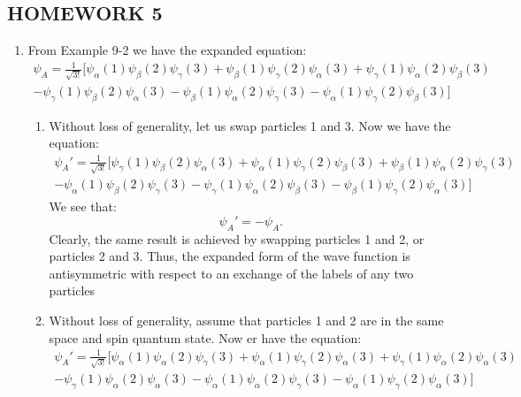 \documentclass[10pt]{article}
\begin{document}

\begin{centering}
  \section*{HOMEWORK 5}
\end{centering}

\begin{enumerate}
\item 
  From Example 9-2 we have the expanded equation:
 \begin{multline*}
   \psi_A = \frac{1}{\sqrt{3!}} [ \psi_ \alpha (1) \psi_ \beta(2) \psi_ \gamma(3) + \psi_ \beta(1) \psi_ \gamma(2) \psi_ \alpha(3) + \psi_ \gamma(1) \psi_ \alpha(2) \psi_ \beta(3) \\ 
   - \psi_ \gamma(1) \psi_ \beta (2) \psi_ \alpha(3) - \psi_ \beta(1) \psi_ \alpha (2) \psi_ \gamma (3) - \psi_ \alpha (1) \psi_ \gamma(2) \psi_ \beta(3) ]
 \end{multline*}
\begin{enumerate}
  \item Without loss of generality, let us swap particles 1 and 3. Now we have the equation:
  \begin{multline*}
    \psi_A' = \frac{1}{\sqrt{3!}} [ \psi_ \gamma (1) \psi_ \beta(2) \psi_ \alpha(3) + \psi_ \alpha(1) \psi_ \gamma(2) \psi_ \beta(3) + \psi_ \beta(1) \psi_ \alpha(2) \psi_ \gamma(3) \\ 
    - \psi_ \alpha(1) \psi_ \beta (2) \psi_ \gamma(3) - \psi_ \gamma(1) \psi_ \alpha (2) \psi_ \beta (3) - \psi_ \beta (1) \psi_ \gamma(2) \psi_ \alpha(3) ]
  \end{multline*}
  We see that: 
  \[
    \psi_A' = - \psi_A
  .\]
  Clearly, the same result is achieved by swapping particles 1 and 2, or particles 2 and 3.
  Thus, the expanded form of the wave function is antisymmetric with respect to an exchange of the labels of any two particles
  \item Without loss of generality, assume that particles 1 and 2 are in the same space and spin quantum state.
    Now er have the equation:
  \begin{multline*}
    \psi_A' = \frac{1}{\sqrt{3!}} [ \psi_ \alpha (1) \psi_ \alpha(2) \psi_ \gamma(3) + \psi_ \alpha(1) \psi_ \gamma(2) \psi_ \alpha(3) + \psi_ \gamma(1) \psi_ \alpha(2) \psi_ \alpha(3) \\ 
    - \psi_ \gamma(1) \psi_ \alpha (2) \psi_ \alpha(3) - \psi_ \alpha(1) \psi_ \alpha (2) \psi_ \gamma (3) - \psi_ \alpha (1) \psi_ \gamma(2) \psi_ \alpha(3) ]

\end{multline*}
\end{enumerate}
\end{enumerate}
\end{document}
